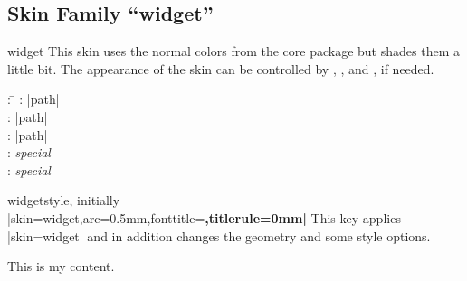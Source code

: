 \clearpage
\subsection{Skin Family \enquote{widget}}
\begin{docSkin}{widget}
  This skin uses the normal colors from the core package but shades
  them a little bit.
  The appearance of the skin can be controlled by ,
  , and ,
  if needed.
\begin{tcolorbox}[skintable=widget]
  \begin{tabbing}
    : \=\kill
    :           \> |path|\\
    : \> |path|\\ 
    :        \> |path|\\
    :    \> \emph{special}\\
    :           \> \emph{special}
  \end{tabbing}
\end{tcolorbox}
\end{docSkin}


\begin{docTcbKey}[][doc updated={2020-09-23}]{widget}{}{style, initially\\
  |skin=widget,arc=0.5mm,fonttitle=\bfseries,titlerule=0mm|
}
  This key applies |skin=widget| and in addition changes the geometry and some style options.
\end{docTcbKey}


\begin{dispExample}
\end{dispExample}


\begin{dispExample}
\begin{tcolorbox}[widget,colback=Salmon!50!white,colframe=FireBrick!75!black,
  adjusted title=A colored box with the ``widget'' skin]
This is my content.
\end{tcolorbox}
\end{dispExample}

\clearpage

